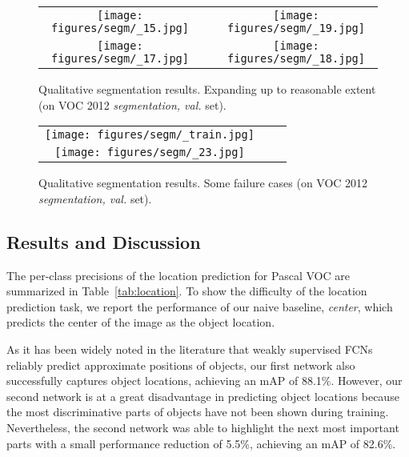 \documentclass[10pt,twocolumn,letterpaper]{article}
\newcommand{\tabfref}[1]{Table~\ref{#1}}
\begin{document}
\begin{figure*}
\begin{center}
\def\arraystretch{0.5}
\begin{tabular}{@{}c@{\hskip 0.01\linewidth}c@{\hskip 0.01\linewidth}c}
\texttt{[image: figures/segm/\_15.jpg]} &&
\texttt{[image: figures/segm/\_19.jpg]} \\
\texttt{[image: figures/segm/\_17.jpg]} &&
\texttt{[image: figures/segm/\_18.jpg]} \\
\end{tabular}
\end{center}
\vspace{-0.2in}
\caption{Qualitative segmentation results. Expanding up to reasonable extent (on VOC 2012 \textit{segmentation, val.} set).}
\label{fig:segm2}
\vspace{-0.1in}
\end{figure*}

\begin{figure}
\begin{center}
\def\arraystretch{0.5}
\begin{tabular}{@{}c@{\hskip 0.01\linewidth}c@{\hskip 0.01\linewidth}c}
\texttt{[image: figures/segm/\_train.jpg]} \\
\texttt{[image: figures/segm/\_23.jpg]} \\
\end{tabular}
\end{center}
\vspace{-0.2in}
\caption{Qualitative segmentation results. Some failure cases (on VOC 2012 \textit{segmentation, val.} set).}
\label{fig:segm3}
\vspace{-0.1in}
\end{figure}


\subsection{Results and Discussion}

The per-class precisions of the location prediction for Pascal VOC are summarized in \tabfref{tab:location}. To show the difficulty of the location prediction task, we report the performance of our naive baseline, \textit{center}, which predicts the center of the image as the object location.

As it has been widely noted in the literature \cite{zhou2016cvpr, Oquab15, SimonyanVZ13bg, kolesnikov2016seed} that weakly supervised FCNs reliably predict approximate positions of objects, our first network also successfully captures object locations, achieving an mAP of 88.1\%. However, our second network is at a great disadvantage in predicting object locations because the most discriminative parts of objects have not been shown during training. Nevertheless, the second network was able to highlight the next most important parts with a small performance reduction of 5.5\%, achieving an mAP of 82.6\%.
\end{document}
